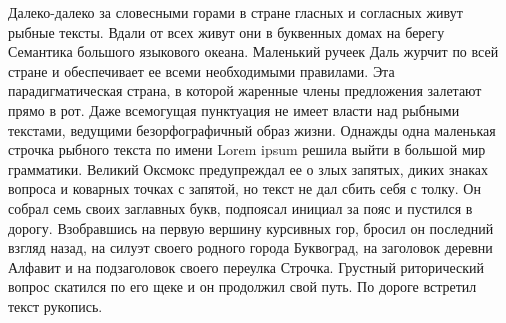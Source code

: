 \Conclusion

Далеко-далеко за словесными горами в стране гласных и согласных живут рыбные тексты. Вдали от всех живут они в буквенных домах на берегу Семантика большого языкового океана. Маленький ручеек Даль журчит по всей стране и обеспечивает ее всеми необходимыми правилами. Эта парадигматическая страна, в которой жаренные члены предложения залетают прямо в рот. Даже всемогущая пунктуация не имеет власти над рыбными текстами, ведущими безорфографичный образ жизни. Однажды одна маленькая строчка рыбного текста по имени Lorem ipsum решила выйти в большой мир грамматики. Великий Оксмокс предупреждал ее о злых запятых, диких знаках вопроса и коварных точках с запятой, но текст не дал сбить себя с толку. Он собрал семь своих заглавных букв, подпоясал инициал за пояс и пустился в дорогу. Взобравшись на первую вершину курсивных гор, бросил он последний взгляд назад, на силуэт своего родного города Буквоград, на заголовок деревни Алфавит и на подзаголовок своего переулка Строчка. Грустный риторический вопрос скатился по его щеке и он продолжил свой путь. По дороге встретил текст рукопись.